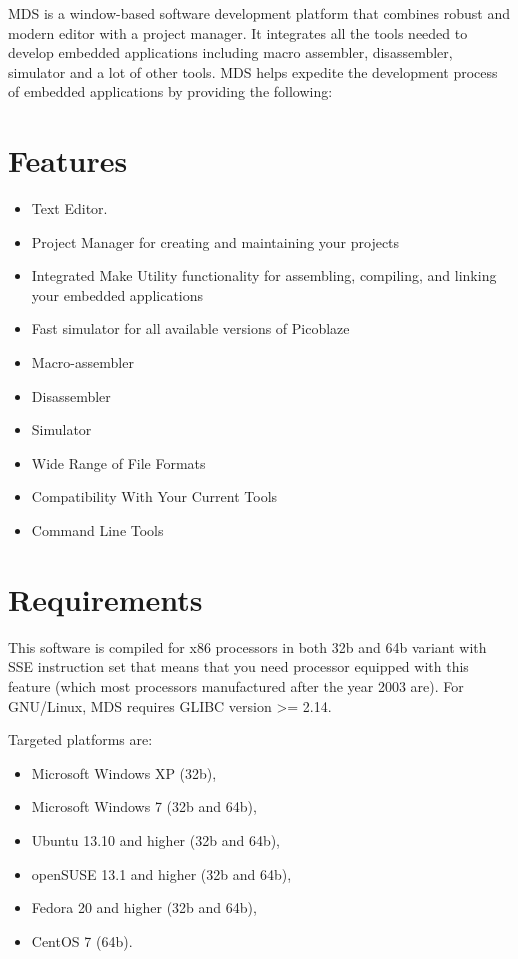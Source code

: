 MDS is a window-based software development platform that combines robust and modern editor with a project manager.
It integrates all the tools needed to develop embedded applications including macro assembler, disassembler, simulator and a lot of
other tools. MDS helps expedite the development process of embedded applications by providing the following:

\section{Features}
    \begin{itemize}
        \item Text Editor.
        \item Project Manager for creating and maintaining your projects
        \item Integrated Make Utility functionality for assembling, compiling, and linking your embedded applications
        \item Fast simulator for all available versions of Picoblaze
        \item Macro-assembler
        \item Disassembler
        \item Simulator
        \item Wide Range of File Formats
        \item Compatibility With Your Current Tools
        \item Command Line Tools
    \end{itemize}

\section{Requirements}
    This software is compiled for x86 processors in both 32b and 64b variant with SSE instruction set
    that means that you need processor equipped with this feature (which most processors manufactured after the year 2003 are).
    For GNU/Linux, MDS requires GLIBC version >= 2.14.

    Targeted platforms are:
    \begin{itemize}
        \item Microsoft Windows XP (32b),
        \item Microsoft Windows 7 (32b and 64b),
        \item Ubuntu 13.10 and higher (32b and 64b),
        \item openSUSE 13.1 and higher (32b and 64b),
        \item Fedora 20 and higher (32b and 64b),
        \item CentOS 7 (64b).
    \end{itemize}

